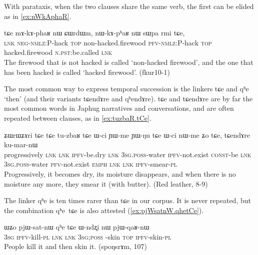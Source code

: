 \documentclass[oldfontcommands,oneside,a4paper,11pt]{article}
\newcommand{\ipa}[1]{{\phon \mbox{#1}}} %
\begin{document}
With parataxis, when the two clauses share the same verb, the first can be elided as in \ref{ex:nWkAphaR}.

\begin{exe}
\ex \label{ex:nWkAphaR}
\gll 
\ipa{tɕe}  	\ipa{mɤ-kɤ-phaʁ}  	\ipa{nɯ}  	\ipa{ɕɯrdɯm,}  	\ipa{nɯ-kɤ-pʰaʁ}  	\ipa{nɯ}  	\ipa{sɯpa}  	\ipa{rmi}  	\ipa{tɕe,}  	\\
\textsc{lnk} \textsc{neg-nmlz:}P-hack \textsc{top} non-hacked.firewood \textsc{pfv-nmlz:}P-hack \textsc{top} hacked.firewood \textsc{n.pst}:be.called \textsc{lnk} \\
\glt The firewood that is not hacked is called `non-hacked firewood', and the one that has been hacked is called `hacked firewood'. (fkur10-1)
\end{exe}

The most common way to express temporal succession is the linkers \ipa{tɕe} and \ipa{qʰe} `then' (and their variants \ipa{tɕendɤre} and \ipa{qʰendɤre}). \ipa{tɕe}   and \ipa{tɕendɤre} are by far the most common words in Japhug narratives and conversations, and are often repeated between clauses, as in \ref{ex:tuzbaR.tCe}. 

\begin{exe}
\ex \label{ex:tuzbaR.tCe}
\gll 
\ipa{ʑɯrɯʑɤri}  	\ipa{tɕe}  	\ipa{tɕe}  	\ipa{tu-zbaʁ}  	\ipa{tɕe}  	\ipa{ɯ-ci}  	\ipa{ɲɯ-me}  	\ipa{ɲɯ-ŋu}  	\ipa{tɕe}  	\ipa{ɯ-ci}  	\ipa{nɯ-me}  	\ipa{ʑo}  	\ipa{tɕe,}  	\ipa{tɕendɤre}  	\ipa{ku-mar-nɯ}  \\
progressively \textsc{lnk}  \textsc{lnk} \textsc{ipfv}-be.dry   \textsc{lnk}  \textsc{3sg.poss}-water \textsc{ipfv}-not.exist \textsc{const}-be \textsc{lnk} \textsc{3sg.poss}-water \textsc{pfv}-not.exist \textsc{emph} \textsc{lnk}  \textsc{lnk} \textsc{ipfv}-smear-\textsc{pl} \\
\glt Progressively, it becomes dry, its moisture  disappears, and when there is no moisture any more, they smear it (with butter). (Red leather, 8-9)
\end{exe}

The linker \ipa{qʰe} is ten times rarer than \ipa{tɕe} in our corpus. It is  never repeated, but the combination \ipa{qʰe tɕe} is also attested (\ref{ex:pjWsatnW.qhetCe}).

\begin{exe}
\ex \label{ex:pjWsatnW.qhetCe}
\gll 
\ipa{ɯʑo}  	\ipa{pjɯ-sat-nɯ}  	\ipa{qʰe}  	\ipa{tɕe}  	\ipa{ɯ-ndʐi}  	\ipa{nɯ}  	\ipa{pjɯ-qaʁ-nɯ}  \\
\textsc{3sg} \textsc{ipfv}-kill-\textsc{pl} \textsc{lnk}  \textsc{lnk} \textsc{3sg;poss }-skin \textsc{top} \textsc{ipfv}-skin-\textsc{pl} \\
\glt People kill it and then skin it. (spoŋsrɤm, 107)
\end{exe}
\end{document}
